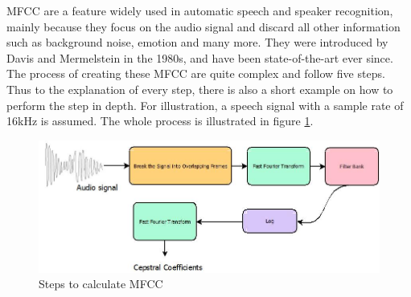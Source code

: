 \gls{MFCC} are a feature widely used in automatic speech and speaker recognition, mainly because they focus on the audio signal and discard all other information such as background noise, emotion and many more. They were introduced by Davis and Mermelstein in the 1980s, and have been state-of-the-art ever since.
\newline
\newline
The process of creating these \gls{MFCC} are quite complex and follow five steps. Thus to the explanation of every step, there is also a short example on how to perform the step in depth. For illustration, a speech signal with a sample rate of 16kHz is assumed. The whole process is illustrated in figure \ref{fig:MFCC-Overview}.

\begin{figure}[htbp]
	\centering
	\includegraphics[scale=0.8]{baa-documentation/img/MFCC_Overview.jpeg}
	\caption[Steps to calculate MFCC]{Steps to calculate MFCC \footnotemark}
	\label{fig:MFCC-Overview}
\end{figure}


